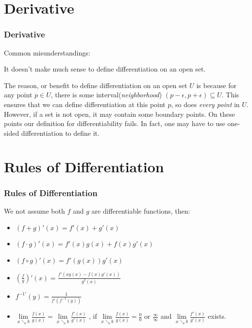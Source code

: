 \documentclass[12pt, t]{beamer}
\renewcommand{\emph}[1]{{\color{Turquoise3}\textsl{#1}}}
\begin{document}
\section{Derivative}
\begin{frame}
    \frametitle{Derivative}
Common misunderstandings:\\
\vspace{0.5em}
    \begin{center}
        It doesn't make much sense to define differentiation on an open set.
    \end{center}
\vspace{0.5em}

The reason, or benefit to define differentiation on an open set $U$ is because for any point $p\in U$, 
there is some interval(\emph{neighborhood}) $(p-\epsilon,p+\epsilon)\subseteq U$. This ensures that 
we can define differentiation at this point $p$, so does \emph{every point} in $U$.\\
\vspace{1em}
However, if a set is not open, it may contain some boundary points. On these points our definition for 
differentiability fails. In fact, one may have to use one-sided differentiation to define it.

\end{frame}

\section{Rules of Differentiation}
\begin{frame}
    \frametitle{Rules of Differentiation}
We not assume both $f$ and $g$ are differentiable functions, then:
\begin{itemize}
    \item $(f+g)'(x)=f'(x)+g'(x)$
    \vspace{1em}
    \item $(f\cdot g)'(x)=f'(x)g(x)+f(x)g'(x)$
    \vspace{1em}
    \item $(f\circ g)'(x)=f'(g(x))g'(x)$
    \vspace{1em}
    \item $(\frac{f}{g})'(x)=\frac{f'(xg(x)-f(x)g'(x))}{g^2(x)}$
    \vspace{1em}
    \item $f^{-1'}(y)=\frac{1}{f'(f^{-1}(y))}$
    \vspace{1em}
    \item $\underset{x\searrow b}{\lim}\frac{f(x)}{g(x)}=\underset{x\searrow b}{\lim}\frac{f'(x)}{g'(x)}$
    , if $\underset{x\searrow b}{\lim}\frac{f(x)}{g(x)}=\frac{0}{0}\text{ or }\frac{\infty}{\infty}$ and $\underset{x\searrow b}{\lim}\frac{f'(x)}{g'(x)}$ exists.
\end{itemize}
\end{frame}
\end{document}
